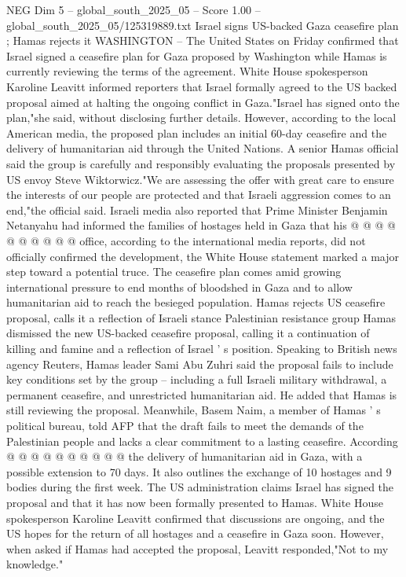 \begin{textsample}{NEG Dim 5 – global\_south\_2025\_05 – Score 1.00 – global\_south\_2025\_05/125319889.txt}  \label{ex:f5_neg_262}
Israel signs US-backed Gaza ceasefire plan ; Hamas rejects it WASHINGTON -- The United States on Friday confirmed that Israel signed a ceasefire plan for Gaza proposed by Washington while Hamas is currently reviewing the terms of the agreement.
White House spokesperson Karoline Leavitt informed reporters that Israel formally agreed to the US backed proposal aimed at halting the ongoing conflict in Gaza."Israel has signed onto the plan,"she said, without disclosing further details.
However, according to the local American media, the proposed plan includes an initial 60-day ceasefire and the delivery of humanitarian aid through the United Nations.
A senior Hamas official said the group is carefully and responsibly evaluating the proposals presented by US envoy Steve Wiktorwicz."We are assessing the offer with great care to ensure the interests of our people are protected and that Israeli aggression comes to an end,"the official said.
Israeli media also reported that Prime Minister Benjamin Netanyahu had informed the families of hostages held in Gaza that his @ @ @ @ @ @ @ @ @ @ office, according to the international media reports, did not officially confirmed the development, the White House statement marked a major step toward a potential truce.
The ceasefire plan comes amid growing international pressure to end months of bloodshed in Gaza and to allow humanitarian aid to reach the besieged population.
Hamas rejects US ceasefire proposal, calls it a reflection of Israeli stance Palestinian resistance group Hamas dismissed the new US-backed ceasefire proposal, calling it a continuation of killing and famine and a reflection of Israel ' s position.
Speaking to British news agency Reuters, Hamas leader Sami Abu Zuhri said the proposal fails to include key conditions set by the group -- including a full Israeli military withdrawal, a permanent ceasefire, and unrestricted humanitarian aid.
He added that Hamas is still reviewing the proposal.
Meanwhile, Basem Naim, a member of Hamas ' s political bureau, told AFP that the draft fails to meet the demands of the Palestinian people and lacks a clear commitment to a lasting ceasefire.
According @ @ @ @ @ @ @ @ @ @ the delivery of humanitarian aid in Gaza, with a possible extension to 70 days.
It also outlines the exchange of 10 hostages and 9 bodies during the first week.
The US administration claims Israel has signed the proposal and that it has now been formally presented to Hamas.
White House spokesperson Karoline Leavitt confirmed that discussions are ongoing, and the US hopes for the return of all hostages and a ceasefire in Gaza soon.
However, when asked if Hamas had accepted the proposal, Leavitt responded,"Not to my knowledge."

\end{textsample}
